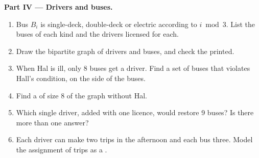 \begin{problem}
\medskip\noindent\textbf{Part IV --- Drivers and buses.}\par\nopagebreak
\begin{enumerate}[resume, beginpenalty=10000]
\item Bus $B_i$ is single-deck, double-deck or electric according to $i \bmod 3$. List the buses of each kind and the
drivers licensed for each.
\item Draw the bipartite graph of drivers and buses, and check the  printed.
\item When Hal is ill, only 8 buses get a driver. Find a set of buses that violates Hall's condition, on the side of the
buses.
\item Find a  of size 8 of the graph without Hal.
\item Which single driver, added with one licence, would restore 9 buses? Is there more than one answer?
\item Each driver can make two trips in the afternoon and each bus three. Model the assignment of trips as a .
\end{enumerate}
\end{problem}
